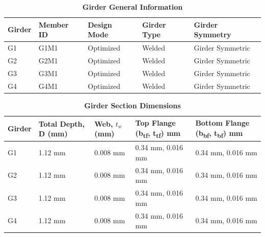\documentclass[12pt,a4paper]{report}
\numberwithin{table}{chapter}
\numberwithin{figure}{chapter}
\begin{document}
\newpage

\vspace{0.4em}
\noindent
            
\vspace{4pt}
\begin{longtable}{|L{2.2cm}|L{1.8cm}|p{3.8cm}|p{3.8cm}|p{3.8cm}|}
\caption{\textbf{Girder General Information}}
\hline
\textbf{Girder} & \textbf{Member ID} & \textbf{Design Mode} & \textbf{Girder Type} & \textbf{Girder Symmetry} \\[6pt]
\hline
G1 & G1M1 & Optimized & Welded & Girder Symmetric \\[8pt]
\hline
G2 & G2M1 & Optimized & Welded & Girder Symmetric \\[8pt]
\hline
G3 & G3M1 & Optimized & Welded & Girder Symmetric \\[8pt]
\hline
G4 & G4M1 & Optimized & Welded & Girder Symmetric \\[8pt]
\hline
\end{longtable}

\vspace{0.6em}

\vspace{4pt}
\begin{longtable}{|L{1.8cm}|L{2.3cm}|L{1.8cm}|p{4.8cm}|p{4.8cm}|}
\caption{\textbf{Girder Section Dimensions}}
\hline
\textbf{Girder} & \textbf{Total Depth, D (mm)} & \textbf{Web, $t_w$ (mm)} & \textbf{Top Flange (b\textsubscript{tf}, t\textsubscript{tf}) mm} & \textbf{Bottom Flange (b\textsubscript{bf}, t\textsubscript{bf}) mm} \\[6pt]
\hline
G1 & 1.12 mm & 0.008 mm & 0.34 mm, 0.016 mm & 0.34 mm, 0.016 mm \\[8pt]
\hline
G2 & 1.12 mm & 0.008 mm & 0.34 mm, 0.016 mm & 0.34 mm, 0.016 mm \\[8pt]
\hline
G3 & 1.12 mm & 0.008 mm & 0.34 mm, 0.016 mm & 0.34 mm, 0.016 mm \\[8pt]
\hline
G4 & 1.12 mm & 0.008 mm & 0.34 mm, 0.016 mm & 0.34 mm, 0.016 mm \\[8pt]
\hline
\end{longtable}

\vspace{0.6em}
\end{document}
